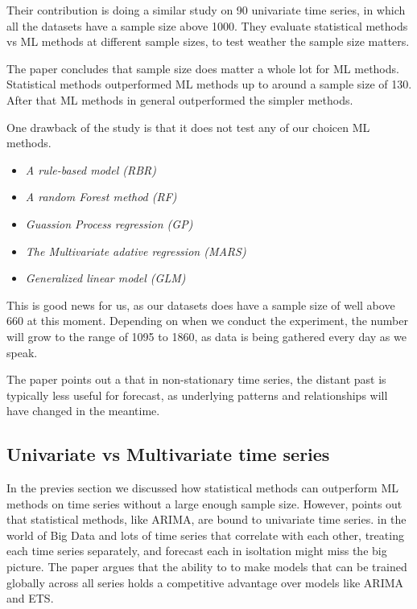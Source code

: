 Their contribution is doing a similar study on 90 univariate time series, in which 
all the datasets have a sample size above 1000. They evaluate statistical methods vs ML methods
at different sample sizes, to test weather the sample size matters.

The paper \cite{Cerqueira2019} concludes that sample size does matter a whole lot for ML methods.
Statistical methods outperformed ML methods up to around a sample size of 130. After that ML methods
in general outperformed the simpler methods.

One drawback of the \cite{Makridakis2018} study is that it does not test any of our choicen ML methods.

\begin{itemize}
  \item \textit{A rule-based model (RBR)}
  \item \textit{A random Forest method (RF)}
  \item \textit{Guassion Process regression (GP)}
  \item \textit{The Multivariate adative regression (MARS)}
  \item \textit{Generalized linear model (GLM)}
\end{itemize}

This is good news for us, as our datasets does have a sample size of well above 660 at this moment.
Depending on when we conduct the experiment, the number will grow to the range of 1095 to 1860,
as data is being gathered every day as we speak.

The paper \citet{Bandara2017} points out a that in non-stationary time series, the distant past is typically less
useful for forecast, as underlying patterns and relationships will have changed in the meantime.


\subsection{Univariate vs Multivariate time series}
In the previes section we discussed how statistical methods can outperform ML methods on
time series without a large enough sample size.
However, \cite{Bandara2017} points out that statistical methods, like ARIMA, are bound to
univariate time series. in the world of Big Data and lots of time series that correlate with each other,
treating each time series separately, and forecast each in isoltation might miss the big picture.
The paper argues that the ability to to make models that can be trained globally across all series
holds a competitive advantage over models like ARIMA and ETS.

